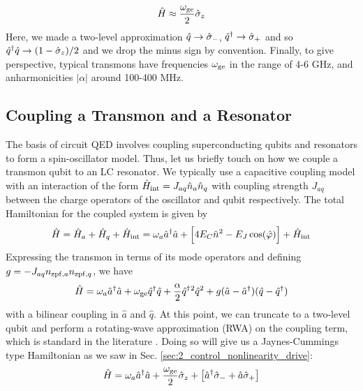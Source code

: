 \begin{equation}
    \hat{H} \approx \frac{\omega_{\rm ge}}{2}\hat{\sigma}_z
\end{equation}
Here, we made a two-level approximation $\hat{q} \to \hat{\sigma}_-$, $\hat{q}^\dagger \to \hat{\sigma}_+$ and so $\hat{q}^\dagger \hat{q} \to (1 - \hat{\sigma}_z)/2$ and we drop the minus sign by convention. Finally, to give perspective, typical transmons have frequencies $\omega_{\rm ge}$ in the range of 4-6 GHz, and anharmonicities $|\alpha|$ around 100-400 MHz. 

\subsection{Coupling a Transmon and a Resonator}

The basis of circuit QED involves coupling superconducting qubits and resonators to form a spin-oscillator model. Thus, let us briefly touch on how we couple a transmon qubit to an LC resonator. We typically use a capacitive coupling model with an interaction of the form $\hat{H}_{\rm int} = J_{aq} \hat{n}_a \hat{n}_q$ with coupling strength $J_{aq}$ between the charge operators of the oscillator and qubit respectively. The total Hamiltonian for the coupled system is given by
\begin{equation}
    \hat{H} = \hat{H}_a + \hat{H}_q + \hat{H}_{\rm int} = \omega_a \hat{a}^\dagger\hat{a} + \Big[4E_C\hat{n}^2 - E_J\cos(\hat{\varphi})\Big] + \hat{H}_{\rm int}
    \label{eq:3_transmon_resonator_full}
\end{equation}
Expressing the transmon in terms of its mode operators and defining $g = -J_{aq}n_{{\rm zpf},a}n_{{\rm zpf},q}$, we have 
\begin{equation}
    \hat{H} = \omega_a \hat{a}^\dagger\hat{a} + \omega_{\rm ge}\hat{q}^\dagger \hat{q} + \frac{\alpha}{2}\hat{q}^\dagger{}^2\hat{q}^2 + g(\hat{a}-\hat{a}^\dagger)(\hat{q}-\hat{q}^\dagger)
    \label{eq:3_transmon_resonator_linear_coupling}
\end{equation}
with a bilinear coupling in $\hat{a}$ and $\hat{q}$. At this point, we can truncate to a two-level qubit and perform a rotating-wave approximation (RWA) on the coupling term, which is standard in the literature \cite{blais2021circuit}. Doing so will give us a Jaynes-Cummings type Hamiltonian as we saw in Sec. \ref{sec:2_control_nonlinearity_drive}:
\begin{equation}
    \hat{H} = \omega_a \hat{a}^\dagger\hat{a} + \frac{\omega_{\rm ge}}{2}\hat{\sigma}_z + \big[\hat{a}^\dagger\hat{\sigma}_- + \hat{a}\hat{\sigma}_+\big]
    \label{eq:3_JC_Hamiltonian_transmon}
\end{equation}
